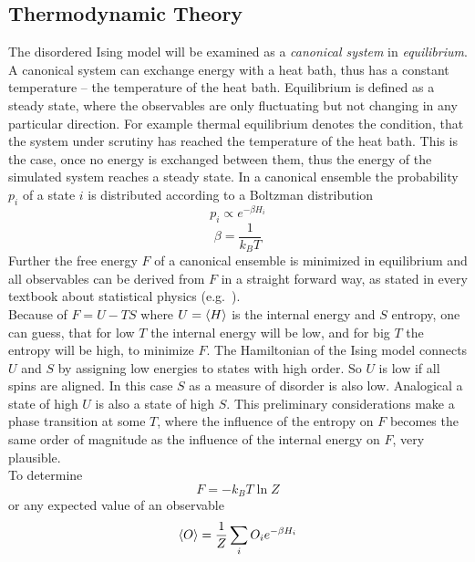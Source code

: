 \subsection{Thermodynamic Theory}
\label{ssec:theory}
    The disordered Ising model will be examined as a \emph{canonical system} in
    \emph{equilibrium}. A canonical system can exchange energy with a
    heat bath, thus has a constant temperature -- the temperature of the
    heat bath.
    Equilibrium is defined as a steady state, where
    the observables are only fluctuating but not changing in any
    particular direction. For example thermal equilibrium denotes the
    condition, that the system under scrutiny has reached the temperature
    of the heat bath. This is the case, once no energy is exchanged
    between them, thus the energy of the simulated system reaches a
    steady state.
    In a canonical ensemble the probability \(p_i\) of a state
    \(i\) is distributed according to a Boltzman distribution
    \begin{equation}
        p_i \propto e^{-\beta H_i}
    \end{equation}
    \begin{equation}
        \beta = \frac{1}{k_B T}
    \end{equation}
    Further the free energy \(F\) of a canonical ensemble is minimized
    in equilibrium and all observables can be derived from \(F\)
    in a straight forward way, as stated in every textbook about
    statistical physics (e.g.\ \cite{nolting2005}).\\
    Because of \(F=U-TS\) where \(U=\left< H \right>\) is the internal energy and
    \(S\) entropy, one can guess, that for low \(T\) the internal energy
    will be low, and for big \(T\) the entropy will be high, to minimize
    \(F\). The Hamiltonian of the Ising model connects \(U\) and \(S\)
    by assigning low energies to states with high order. So \(U\) is low
    if all spins are aligned. In this case \(S\) as a measure of
    disorder is also low. Analogical a state of high \(U\) is also
    a state of high \(S\).
    This preliminary considerations make a phase transition at some
    \(T\), where the influence of the entropy on \(F\) becomes the same
    order of magnitude as the influence of the internal energy on \(F\),
    very plausible.\\
    To determine
    \begin{equation}
        F=-k_{B}T \ln{Z}
    \end{equation}
    or any expected value of an observable
    \begin{equation}
        \left< O \right> = \frac{1}{Z} \sum_i O_i e^{-\beta H_i}
    \end{equation}
